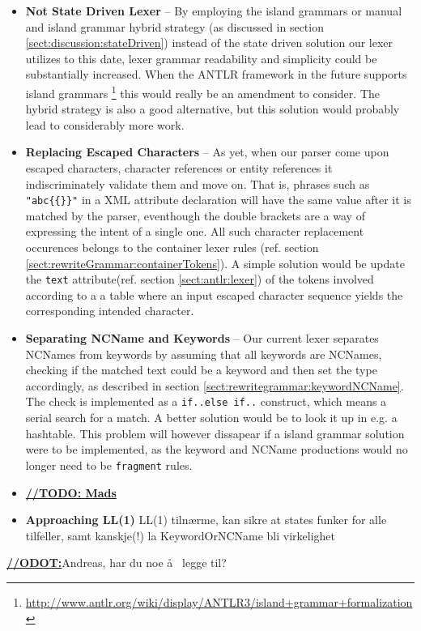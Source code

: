 \begin{itemize}

\item \textbf{Not State Driven Lexer} -- By employing the island grammars or manual and island grammar hybrid strategy (as discussed in section \ref{sect:discussion:stateDriven}) instead of the state driven solution our lexer utilizes to this date, lexer grammar readability and simplicity could be substantially increased. When the ANTLR framework in the future supports island grammars \footnote{\url{http://www.antlr.org/wiki/display/ANTLR3/island+grammar+formalization}} this would really be an amendment to consider. The hybrid strategy is also a good alternative, but this solution would probably lead to considerably more work.

\item \textbf{Replacing Escaped Characters} -- As yet, when our parser come upon escaped characters, character references or entity references it indiscriminately validate them and move on. That is, phrases such as \verb!"abc{{}}"! in a XML attribute declaration will have the same value after it is matched by the parser, eventhough the double brackets are a way of expressing the intent of a single one. All such character replacement occurences belongs to the container lexer rules (ref. section \ref{sect:rewriteGrammar:containerTokens}). A simple solution would be update the \verb!text! attribute(ref. section \ref{sect:antlr:lexer}) of the tokens involved according to a a table where an input escaped character sequence yields the corresponding intended character.

\item \textbf{Separating NCName and Keywords} -- Our current lexer separates NCNames from keywords by assuming that all keywords are NCNames, checking if the matched text could be a keyword and then set the type accordingly, as described in section \ref{sect:rewritegrammar:keywordNCName}. The check is implemented as a \verb!if..else if..! construct, which means a serial search for a match. A better solution would be to look it up in e.g. a hashtable. This problem will however dissapear if a island grammar solution were to be implemented, as the keyword and NCName productions would no longer need to be \verb!fragment! rules.

\item \underline{\textbf{\LARGE //TODO: Mads}} 

\item \textbf{Approaching LL(1)} LL(1) tiln\ae rme, kan sikre at states funker for alle tilfeller, samt kanskje(!) la KeywordOrNCName bli virkelighet

\end{itemize}

\underline{\textbf{\LARGE //ODOT:}}Andreas, har du noe \aa~ legge til?




